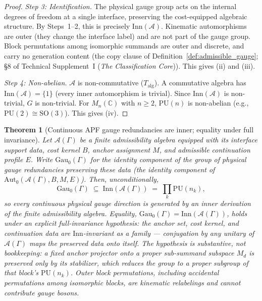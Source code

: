 \documentclass[11pt]{article}
\newtheorem{theorem}{Theorem}[section]
\theoremstyle{definition}
\newcommand{\TSI}{Technical Supplement~I (\emph{The Classification Core})}
\begin{document}
\begin{proof}
\textit{Step 3: Identification.}\quad
The physical gauge group acts on the internal degrees of freedom at a
single interface, preserving the cost-equipped algebraic structure.  By
Steps~1--2, this is precisely $\mathrm{Inn}(\mathcal{A})$.  Kinematic
automorphisms are outer (they change the interface label) and are not
part of the gauge group.  Block permutations among isomorphic summands are outer and discrete,
and carry no generation content (the copy clause of
Definition~\ref{def:admissible_gauge}; \S8 of \TSI{}).
This gives (ii) and (iii).

\textit{Step 4: Non-abelian.}\quad
$\mathcal{A}$ is non-commutative ($T_{\mathrm{alg}}$).  A commutative
algebra has $\mathrm{Inn}(\mathcal{A}) = \{1\}$ (every inner
automorphism is trivial).  Since $\mathrm{Inn}(\mathcal{A})$ is
non-trivial, $G$ is non-trivial.  For $M_n(\mathbb{C})$ with $n \ge 2$,
$\mathrm{PU}(n)$ is non-abelian (e.g., $\mathrm{PU}(2) \cong
\mathrm{SO}(3)$).  This gives (iv).
\end{proof}


\begin{theorem}[Continuous APF gauge redundancies are inner; equality under full invariance]
\label{thm:continuous_gauge_inner_v34}
Let $\mathcal A(\Gamma)$ be a finite admissibility algebra equipped with
its interface support data, cost kernel $B$, anchor assignment $M$, and
admissible continuation profile $E$.  Write $\mathrm{Gau}_0(\Gamma)$ for
the identity component of the group of physical gauge redundancies
preserving these data (the identity component of
$\mathrm{Aut}_0(\mathcal A(\Gamma),B,M,E)$).  Then, unconditionally,
\[
  \mathrm{Gau}_0(\Gamma) \;\subseteq\; \mathrm{Inn}(\mathcal A(\Gamma))
  \;=\; \prod_k \mathrm{PU}(n_k),
\]
so every continuous physical gauge direction is generated by an inner
derivation of the finite admissibility algebra.  Equality,
$\mathrm{Gau}_0(\Gamma) = \mathrm{Inn}(\mathcal A(\Gamma))$, holds under
an explicit \emph{full-invariance hypothesis}: the anchor set, cost
kernel, and continuation data are $\mathrm{Inn}$-invariant as a family
--- conjugation by any unitary of $\mathcal A(\Gamma)$ maps the
preserved data onto itself.  The hypothesis is substantive, not
bookkeeping: a fixed anchor projector onto a proper sub-summand
subspace $M_d$ is preserved only by its stabilizer, which reduces the
group to a proper subgroup of that block's $\mathrm{PU}(n_k)$.  Outer
block permutations, including accidental permutations among isomorphic
blocks, are kinematic relabelings and cannot contribute gauge bosons.
\end{theorem}
\end{document}
